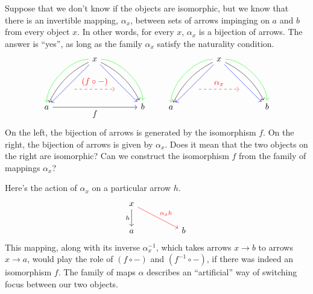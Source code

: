 \documentclass[DaoFP]{subfiles}
\begin{document}
Suppose that we don't know if the objects are isomorphic, but we know that there is an invertible mapping, $\alpha_x$, between sets of arrows impinging on $a$ and $b$ from every object $x$. In other words, for every $x$, $\alpha_x$ is a bijection of arrows. The answer is ``yes'', as long as the family $\alpha_x$ satisfy the naturality condition.
\[
 \begin{tikzcd}
 \node(x) at (0, 2) {x};
 \node(a) at (-2, 0) {a};
 \node(b) at (2, 0) {b};
 \node(c1) at (-1, 1.5) {};
 \node(c2) at (-1.5, 1) {};
 \node(c3) at (-1, 2) {};
 \node(c4) at (-2, 1) {};
 \node(d1) at (1, 1.5) {};
 \node(d2) at (1.5, 1) {};
 \node(d3) at (1, 2) {};
 \node(d4) at (2, 1) {};
\node (aa) at (-1, 0.75) {};
 \node (bb) at (1, 0.75) {};
 \draw[->] (x) .. controls (c1)  and (c2) .. (a); %
 \draw[->, green] (x) .. controls (c3)  and (c4) .. (a); %
 \draw[->, blue] (x) -- (a); 
  \draw[->] (x) .. controls (d1)  and (d2) .. (b); %
 \draw[->, green] (x) .. controls (d3)  and (d4) .. (b); %
 \draw[->, blue] (x) -- (b); 
 \draw[->, red, dashed] (aa) -- node[above]{(f \circ -)} (bb);
\draw[->] (a) -- node[below]{f} (b);
 \end{tikzcd}
 \qquad
 \begin{tikzcd}
 \node(x) at (0, 2) {x};
 \node(a) at (-2, 0) {a};
 \node(b) at (2, 0) {b};
 \node(c1) at (-1, 1.5) {};
 \node(c2) at (-1.5, 1) {};
 \node(c3) at (-1, 2) {};
 \node(c4) at (-2, 1) {};
 \node(d1) at (1, 1.5) {};
 \node(d2) at (1.5, 1) {};
 \node(d3) at (1, 2) {};
 \node(d4) at (2, 1) {};
\node (aa) at (-1, 0.75) {};
 \node (bb) at (1, 0.75) {};
 \draw[->] (x) .. controls (c1)  and (c2) .. (a); %
 \draw[->, green] (x) .. controls (c3)  and (c4) .. (a); %
 \draw[->, blue] (x) -- (a); 
  \draw[->] (x) .. controls (d1)  and (d2) .. (b); %
 \draw[->, green] (x) .. controls (d3)  and (d4) .. (b); %
 \draw[->, blue] (x) -- (b); 
 \draw[->, red, dashed] (aa) -- node[above]{\alpha_x} (bb);
 \end{tikzcd}
\]
On the left, the bijection of arrows is generated by the isomorphism $f$. On the right, the bijection of arrows is given by $\alpha_x$. Does it mean that the two objects on the right are isomorphic? Can we construct the isomorphism $f$ from the family of mappings $\alpha_x$?

Here's the action of $\alpha_x$ on a particular arrow $h$. 
\[
 \begin{tikzcd}
 x
 \arrow[d, "h"']
 \arrow[rrd, red, "\alpha_x h"]
  \\
 a
  && b
 \end{tikzcd}
\]
This mapping, along with its inverse $\alpha^{-1}_x$, which takes arrows $x \to b$ to arrows $x \to a$, would play the role of $(f \circ -)$ and $(f^{-1} \circ -)$, if there was indeed an isomorphism $f$. The family of maps $\alpha$ describes an ``artificial'' way of switching focus between our two objects.
\end{document}
